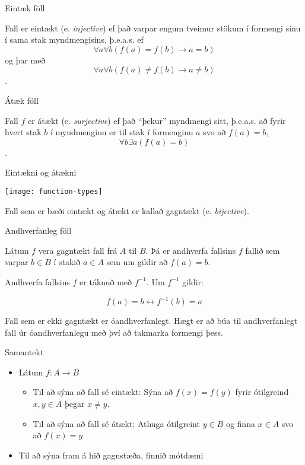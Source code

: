 \documentclass{beamer}
\begin{document}
\begin{frame}{Eintæk föll}
\begin{tcolorbox}[title=Eintækt fall]
Fall er eintækt (e. \emph{injective}) ef það varpar engum tveimur stökum í formengi sínu í sama stak myndmengisins, þ.e.a.s. ef \[\forall a \forall b (f(a) = f(b) \to a = b)\] og þar með \[\forall a \forall b (f(a) \neq f(b) \to a \neq b)\].
\end{tcolorbox}
\end{frame}

\begin{frame}{Átæk föll}
\begin{tcolorbox}[title=Átækt fall]
Fall $f$ er átækt (e. \emph{surjective}) ef það ``þekur'' myndmengi sitt, þ.e.a.s. að fyrir hvert stak $b$ í myndmenginu er til stak í formenginu $a$ svo að $f(a) = b$, \[\forall b \exists a (f(a) = b)\].
\end{tcolorbox}
\end{frame}

\begin{frame}{Eintækni og átækni}
\begin{center}
\texttt{[image: function-types]}
\end{center}
Fall sem er bæði eintækt og átækt er kallað gagntækt (e. \emph{bijective}).
\end{frame}

\begin{frame}{Andhverfanleg föll}
\begin{tcolorbox}[title=Andhverfanlegt fall]
Látum $f$ vera gagntækt fall frá $A$ til $B$. Þá er andhverfa fallsins $f$ fallið sem varpar $b \in B$ í stakið $a \in A$ sem um gildir að $f(a) = b$.

Andhverfa fallsins $f$ er táknuð með $f^{-1}$. Um $f^{-1}$ gildir:

\[
 f(a) = b \leftrightarrow f^{-1}(b) = a
\]

\end{tcolorbox}
Fall sem er ekki gagntækt er óandhverfanlegt. Hægt er að búa til andhverfanlegt fall úr óandhverfanlegu með því að takmarka formengi þess.
\end{frame}

\begin{frame}{Samantekt}
\begin{itemize}
 \item Látum $f: A \to B$
 \begin{itemize}
  \item Til að sýna að fall sé eintækt: Sýna að $f(x) = f(y)$ fyrir ótilgreind $x, y \in A$ þegar $x \neq y$.
  \item Til að sýna að fall sé átækt: Athuga ótilgreint $y \in B$ og finna $x \in A$ svo að $f(x) = y$
 \end{itemize}
 \item Til að sýna fram á hið gagnstæða, finnið mótdæmi
\end{itemize}

\end{frame}
\end{document}
